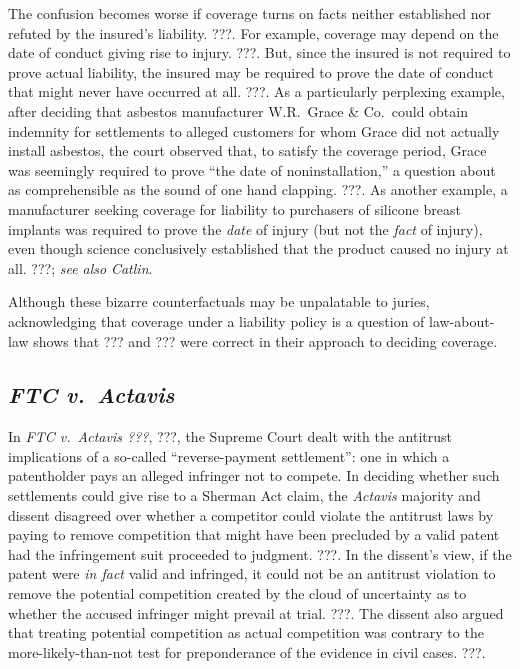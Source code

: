 \documentclass[
  12pt,
  letterpaper,
]{scrartcl}
\begin{document}
The confusion becomes worse if coverage turns on facts neither established nor
refuted by the insured's liability. ???. For example, coverage may depend on
the date of conduct giving rise to injury. ???. But, since the insured is not
required to prove actual liability, the insured may be required to prove the
date of conduct that might never have occurred at all. ???. As a particularly
perplexing example, after deciding that asbestos manufacturer W.R.~Grace \&
Co.~could obtain indemnity for settlements to alleged customers for whom Grace
did not actually install asbestos, the court observed that, to satisfy the
coverage period, Grace was seemingly required to prove ``the date of
noninstallation,'' a question about as comprehensible as the sound of one hand
clapping. ???. As another example, a manufacturer seeking coverage for
liability to purchasers of silicone breast implants was required to prove the
\emph{date} of injury (but not the \emph{fact} of injury), even though science
conclusively established that the product caused no injury at all. ???;
\textit{see also} \textit{Catlin}.

Although these bizarre counterfactuals may be unpalatable to juries,
acknowledging that coverage under a liability policy is a question of
law-about-law shows that ??? and ??? were correct in their approach to deciding
coverage.


\subsection{\textit{FTC v.~Actavis}}

In \textit{FTC v.~Actavis ???}, ???, the Supreme Court dealt with the antitrust
implications of a so-called ``reverse-payment settlement'': one in which a
patentholder pays an alleged infringer not to compete. In deciding whether such
settlements could give rise to a Sherman Act claim, the \textit{Actavis}
majority and dissent disagreed over whether a competitor could violate the
antitrust laws by paying to remove competition that might have been precluded
by a valid patent had the infringement suit proceeded to judgment. ???. In the
dissent's view, if the patent were \emph{in fact} valid and infringed, it could
not be an antitrust violation to remove the potential competition created by
the cloud of uncertainty as to whether the accused infringer might prevail at
trial. ???. The dissent also argued that treating potential competition as
actual competition was contrary to the more-likely-than-not test for
preponderance of the evidence in civil cases. ???.
\end{document}
